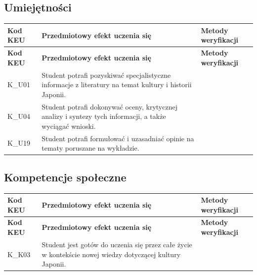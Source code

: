 \documentclass[12pt, a4paper]{article}
\newcommand{\thdrule}{\noalign{\global\setlength{\extrarowheight}{0pt}}}
\newcommand{\thdend}{\noalign{\global\setlength{\extrarowheight}{3pt}}}
\begin{document}
\subsection*{Umiejętności}
{\scriptsize
\begin{longtable}{m{1.6cm}m{9.0cm}m{4.2cm}}
\thdrule\toprule
\rowcolor{pjatkRed} {\color{white}\footnotesize\textbf{\vphantom{Ag}Kod KEU}} & {\color{white}\footnotesize\textbf{\vphantom{Ag}Przedmiotowy efekt uczenia się}} & {\color{white}\footnotesize\textbf{\vphantom{Ag}Metody weryfikacji}} \\
\midrule\thdend
\endfirsthead
\thdrule\toprule
\rowcolor{pjatkRed} {\color{white}\footnotesize\textbf{\vphantom{Ag}Kod KEU}} & {\color{white}\footnotesize\textbf{\vphantom{Ag}Przedmiotowy efekt uczenia się}} & {\color{white}\footnotesize\textbf{\vphantom{Ag}Metody weryfikacji}} \\
\midrule\thdend
\endhead
  \rowcolor{tableRowLight} K\_U01 & Student potrafi pozyskiwać specjalistyczne informacje z literatury na temat kultury i historii Japonii. &  \\
  \rowcolor{tableRowAlt} K\_U04 & Student potrafi dokonywać oceny, krytycznej analizy i syntezy tych informacji, a także wyciągać wnioski. &  \\
  \rowcolor{tableRowLight} K\_U19 & Student potrafi formułować i uzasadniać opinie na tematy poruszane na wykładzie. &  \\
\bottomrule
\end{longtable}}

\subsection*{Kompetencje społeczne}
{\scriptsize
\begin{longtable}{m{1.6cm}m{9.0cm}m{4.2cm}}
\thdrule\toprule
\rowcolor{pjatkRed} {\color{white}\footnotesize\textbf{\vphantom{Ag}Kod KEU}} & {\color{white}\footnotesize\textbf{\vphantom{Ag}Przedmiotowy efekt uczenia się}} & {\color{white}\footnotesize\textbf{\vphantom{Ag}Metody weryfikacji}} \\
\midrule\thdend
\endfirsthead
\thdrule\toprule
\rowcolor{pjatkRed} {\color{white}\footnotesize\textbf{\vphantom{Ag}Kod KEU}} & {\color{white}\footnotesize\textbf{\vphantom{Ag}Przedmiotowy efekt uczenia się}} & {\color{white}\footnotesize\textbf{\vphantom{Ag}Metody weryfikacji}} \\
\midrule\thdend
\endhead
  \rowcolor{tableRowLight} K\_K03 & Student jest gotów do uczenia się przez całe życie w kontekście nowej wiedzy dotyczącej kultury Japonii. &  \\
\bottomrule
\end{longtable}}
\end{document}
